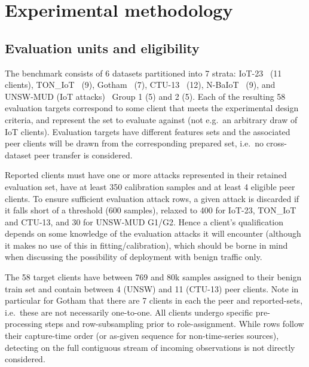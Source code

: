 \section{Experimental methodology} 
\label{sec:experiment} 

\subsection{Evaluation units and eligibility} 
The benchmark consists of 6 datasets partitioned into 7 strata: IoT-23~\cite{garcia2020iot23} (11 clients), TON\_IoT~\cite{moustafa2021ton} (9), Gotham~\cite{belarbi2025gothamdata,belarbi2026descriptor} (7), CTU-13~\cite{garcia2014ctu} (12), N-BaIoT~\cite{nbaiot2018,nbaiotdata2018} (9), and UNSW-MUD (IoT attacks)~\cite{hamza2019mud} Group 1 (5) and 2 (5). Each of the resulting 58 evaluation targets correspond to some client that meets the experimental design criteria, and represent the set to evaluate against (not e.g.\ an arbitrary draw of IoT clients). Evaluation targets have different features sets and the associated peer clients will be drawn from the corresponding prepared set, i.e.\ no cross-dataset peer transfer is considered.

Reported clients must have one or more attacks represented in their retained evaluation set, have at least 350 calibration samples and at least 4 eligible peer clients. To ensure sufficient evaluation attack rows, a given attack is discarded if it falls short of a threshold (600 samples), relaxed to 400 for IoT-23, TON\_IoT and CTU-13, and 30 for UNSW-MUD G1/G2. Hence a client's qualification depends on some knowledge of the evaluation attacks it will encounter (although it makes no use of this in fitting/calibration), which should be borne in mind when discussing the possibility of deployment with benign traffic only.

The 58 target clients have between 769 and 80k samples assigned to their benign train set and contain between 4 (UNSW) and 11 (CTU-13) peer clients. Note in particular for Gotham that there are 7 clients in each the peer and reported-sets, i.e.\ these are not necessarily one-to-one. All clients undergo specific pre-processing steps and row-subsampling prior to role-assignment. While rows follow their capture-time order (or as-given sequence for non-time-series sources), detecting on the full contiguous stream of incoming observations is not directly considered.

